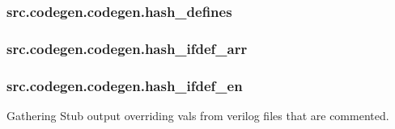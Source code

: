 \hypertarget{classsrc_1_1codegen_1_1codegen_a8c1fbafee413be6472edfa3086744088}{
\subsubsection[{hash\-\_\-defines}]{\setlength{\rightskip}{0pt plus 5cm}src.\-codegen.\-codegen.\-hash\-\_\-defines}}\label{classsrc_1_1codegen_1_1codegen_a8c1fbafee413be6472edfa3086744088}
\hypertarget{classsrc_1_1codegen_1_1codegen_acc991347bbd3ec540567af9f2f45badd}{
\subsubsection[{hash\-\_\-ifdef\-\_\-arr}]{\setlength{\rightskip}{0pt plus 5cm}src.\-codegen.\-codegen.\-hash\-\_\-ifdef\-\_\-arr}}\label{classsrc_1_1codegen_1_1codegen_acc991347bbd3ec540567af9f2f45badd}
\hypertarget{classsrc_1_1codegen_1_1codegen_a0d57c346d2836db9ede8bba7d2a94fdf}{
\subsubsection[{hash\-\_\-ifdef\-\_\-en}]{\setlength{\rightskip}{0pt plus 5cm}src.\-codegen.\-codegen.\-hash\-\_\-ifdef\-\_\-en}}\label{classsrc_1_1codegen_1_1codegen_a0d57c346d2836db9ede8bba7d2a94fdf}


Gathering Stub output overriding vals from verilog files that are commented. 

